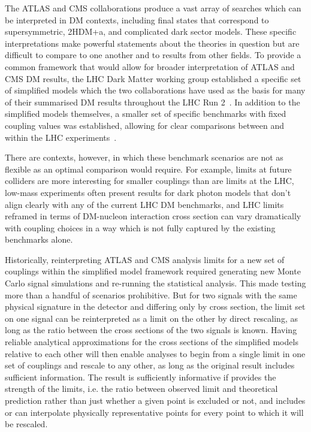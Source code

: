 \documentclass[a4paper, 11pt]{article}
\begin{document}
The ATLAS and CMS collaborations produce a vast array of searches which can be interpreted in DM contexts, including final states that correspond to supersymmetric, 2HDM+a, and complicated dark sector models. These specific interpretations make powerful statements about the theories in question but are difficult to compare to one another and to results from other fields. To provide a common framework that would allow for broader interpretation of ATLAS and CMS DM results, the LHC Dark Matter working group established a specific set of simplified models which the two collaborations have used as the basis for many of their summarised DM results throughout the LHC Run 2~\cite{ABERCROMBIE2020100371}. In addition to the simplified models themselves, a smaller set of specific benchmarks with fixed coupling values was established, allowing for clear comparisons between and within the LHC experiments~\cite{BOVEIA2020100365,ALBERT2019100377,ATL-PHYS-PUB-2020-021,CMSSummary}.

There are contexts, however, in which these benchmark scenarios are not as flexible as an optimal comparison would require. For example, limits at future colliders are more interesting for smaller couplings than are limits at the LHC, low-mass experiments often present results for dark photon models that don't align clearly with any of the current LHC DM benchmarks, and LHC limits reframed in terms of DM-nucleon interaction cross section can vary dramatically with coupling choices in a way which is not fully captured by the existing benchmarks alone.

Historically, reinterpreting ATLAS and CMS analysis limits for a new set of couplings within the simplified model framework required generating new Monte Carlo signal simulations and re-running the statistical analysis. This made testing more than a handful of scenarios prohibitive. But for two signals with the same physical signature in the detector and differing only by cross section, the limit set on one signal can be reinterpreted as a limit on the other by direct rescaling, as long as the ratio between the cross sections of the two signals is known. Having reliable analytical approximations for the cross sections of the simplified models relative to each other will then enable analyses to begin from a single limit in one set of couplings and rescale to any other, as long as the original result includes sufficient information. The result is sufficiently informative if provides the strength of the limits, i.e. the ratio between observed limit and theoretical prediction rather than just whether a given point is excluded or not, and includes or can interpolate physically representative points for every point to which it will be rescaled.
\end{document}
